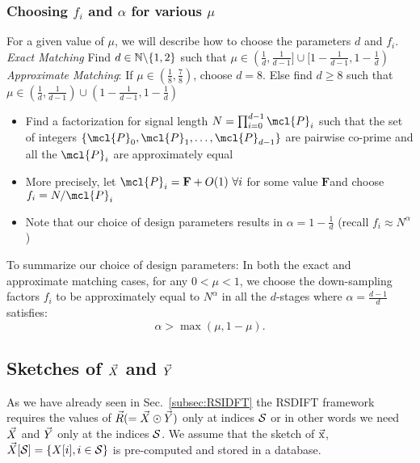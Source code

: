 \documentclass[journal,11pt,onecolumn]{IEEEtran}  %
\begin{document}
\subsubsection{Choosing $f_i$ and $\alpha$ for various $\mu$}
\label{subsec:DesignParameters}
For a given value of $\mu$, we will describe how to choose the parameters $d$ and $f_i$.\\
 {\it Exact Matching} Find $d\in \mathbb{N}\backslash \{1,2\}$ such that $\mu\in(\frac{1}{d},\frac{1}{d-1}]\cup[1-\frac{1}{d-1},1-\frac{1}{d})$\\
{\it Approximate Matching}: If $\mu\in(\frac{1}{8},\frac{7}{8})$, choose $d=8$. Else find $d\geq 8$ such that $\mu\in(\frac{1}{d},\frac{1}{d-1})\cup(1-\frac{1}{d-1},1-\frac{1}{d})$
\begin{itemize}
\item Find a factorization for signal length $N=\prod_{i=0}^{d-1} \mcl{P}_i$ such that the set of integers $\{\mcl{P}_0,\mcl{P}_1,\ldots,\mcl{P}_{d-1}\}$ are pairwise co-prime and all the $\mcl{P}_i$ are approximately equal
\item More precisely, let $\mcl{P}_i=\mathbf{F}+O(1) ~\forall i$ for some value $\mathbf{F}$and choose $f_i=N/\mcl{P}_i$
\item Note that our choice of design parameters results in $\alpha=1-\frac{1}{d}$ (recall $f_i\approx N^{\alpha}$)
\end{itemize} 
To summarize our choice of design parameters: In both the exact and approximate matching cases, for any $0<\mu<1$, we choose the down-sampling factors $f_i$ to be approximately equal to $N^{\alpha}$ in all the $d$-stages where $\alpha=\frac{d-1}{d}$ satisfies:
\begin{equation}
\label{Eqn:IneqMuAlpha}
\alpha>\max(\mu,1-\mu).
\end{equation}

\subsection{Sketches of $\vec{X}$ and $\vec{Y}$} 
\label{subsec:skteches}		 
 As we have already seen in Sec.~\ref{subsec:RSIDFT} the RSDIFT framework requires the values of $\vec{R}(=\vec{X}\odot \vec{Y})$ only at indices $\mathcal{S}$ or in other words we need $\vec{X}$ and $\vec{Y}$ only at the indices $\mathcal{S}$. We assume that the sketch of $\vec{\mathrm{x}}$, $ \vec{X}[\mathcal{S}]= \{X[i],i\in \mathcal{S}\}$ is pre-computed and stored in a database.
\end{document}
